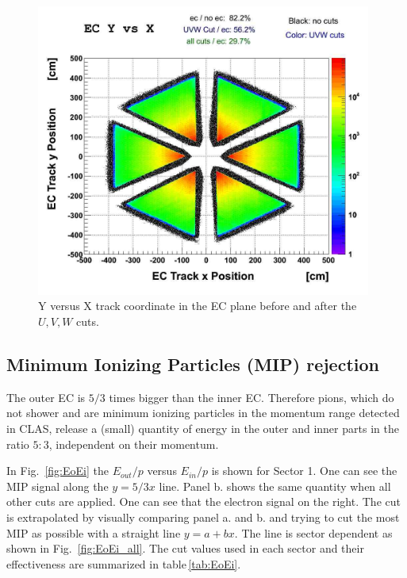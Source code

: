 \vspace{1cm}
\begin{figure}[h]
  \centering
		\includegraphics[width=0.98\textwidth]{img/EC_yvsx.jpg}
		\caption{Y versus X track coordinate in the EC plane before and after 
					the $U,V,W$ cuts.}
 		\label{fig:ECyx}
\end{figure}


\clearpage
\subsection{Minimum Ionizing Particles (MIP) rejection}
The outer EC is $5/3$ times bigger than the inner EC. Therefore pions,
which do not shower and are minimum ionizing particles in the momentum range 
detected in CLAS, release a (small) quantity of energy in the outer and inner
parts in the ratio $5:3$, independent on their momentum.

In Fig.~\ref{fig:EoEi} the $E_{out}/p$ versus $E_{in}/p$ is shown for Sector 1.
One can see the MIP signal along the $y=5/3x $ line.
Panel b. shows the same quantity when all other cuts are applied. 
One can see that the electron signal on the right.
The cut is extrapolated by visually comparing panel a. and b. and trying to
cut the most MIP as possible with a straight line $y = a + bx$. The line
is sector dependent as shown in Fig.~\ref{fig:EoEi_all}.
The cut values used in each sector and their effectiveness are summarized in 
table\,\ref{tab:EoEi}.


